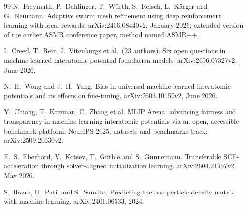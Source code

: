 \documentclass[11pt, a4paper]{article}
\begin{document}
\begin{thebibliography}{99}
 N.~Freymuth, P.~Dahlinger, T.~W\"urth, S.~Reisch,
L.~K\"arger and G.~Neumann. Adaptive swarm mesh refinement using deep
reinforcement learning with local rewards. arXiv:2406.08440v2, January 2026;
extended version of the earlier ASMR conference paper, method named ASMR++.

 I.~Creed, T.~Rein, I.~Vitenburgs et al.\ (23
authors). Six open questions in machine-learned interatomic potential
foundation models. arXiv:2606.07327v2, June 2026.

 N.~H.~Wong and J.~H.~Yang. Bias in universal
machine-learned interatomic potentials and its effects on fine-tuning.
arXiv:2603.10159v2, June 2026.

 Y.~Chiang, T.~Kreiman, C.~Zhang et al. MLIP Arena:
advancing fairness and transparency in machine learning interatomic
potentials via an open, accessible benchmark platform. NeurIPS 2025,
datasets and benchmarks track; arXiv:2509.20630v2.

 E.~S.~Eberhard, V.~Kotsev, T.~G\"uthle and
S.~G\"unnemann. Transferable SCF-acceleration through solver-aligned
initialization learning. arXiv:2604.21657v2, May 2026.

 S.~Hazra, U.~Patil and S.~Sanvito. Predicting
the one-particle density matrix with
machine learning. arXiv:2401.06533, 2024.

\end{thebibliography}
\end{document}
